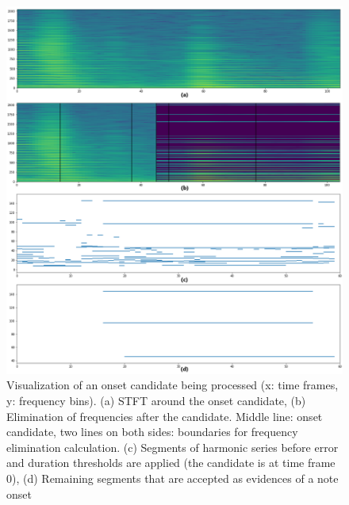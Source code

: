 \begin{figure}
    \centering
    \includegraphics[width=\columnwidth]{methods/gs_0_788_note.png}
    \caption{Visualization of an onset candidate being processed (x: time frames, y: frequency bins). (a) STFT around the onset candidate, (b) Elimination of frequencies after the candidate. Middle line: onset candidate, two lines on both sides: boundaries for frequency elimination calculation. (c) Segments of harmonic series before error and duration thresholds are applied (the candidate is at time frame 0), (d) Remaining segments that are accepted as evidences of a note onset }
    \label{fig:gs_0_note}
\end{figure}

